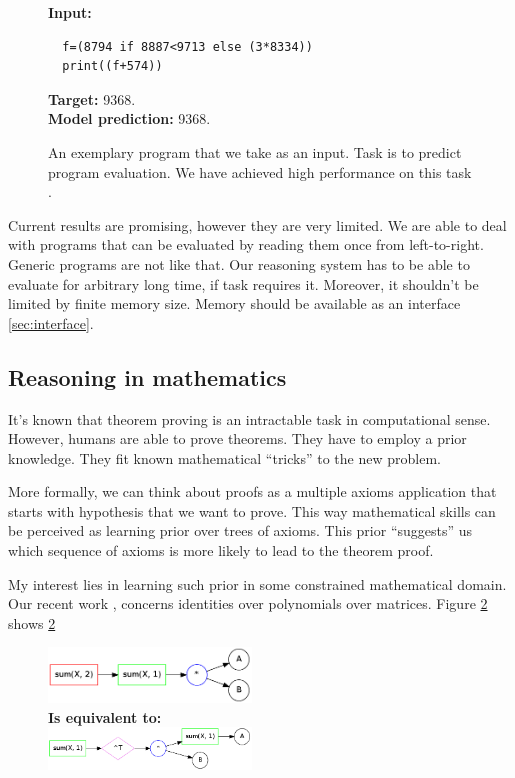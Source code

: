 \documentclass{article}
\begin{document}
\begin{figure}
  \begin{code}
  \begin{mdframed}
  {\bf Input:}
  \begin{lstlisting}
  f=(8794 if 8887<9713 else (3*8334))
  print((f+574))
  \end{lstlisting} 
  {\bf Target:} 9368. \\
  {\bf Model prediction:} 9368. 
  \end{mdframed}
  \end{code}
  \caption{An exemplary program that we take as an input. Task is to predict program evaluation. We have 
  achieved high performance on this task \cite{zaremba2014execute}.}
  \label{fig:prog}
\end{figure}


Current results are promising, however they are very limited. We are able to deal with programs
that can be evaluated by reading them once from left-to-right. Generic programs are not like that.
Our reasoning system has to be able to evaluate for arbitrary long time, if
task requires it. Moreover, it shouldn't be limited by finite memory size. Memory should be available
as an interface \ref{sec:interface}.


\subsection{Reasoning in mathematics}
It's known that theorem proving is an intractable task in computational sense. 
However, humans are able to prove theorems. They have to employ a prior
knowledge. They fit known mathematical ``tricks'' to the new problem.


More formally, we can think about proofs as a multiple axioms application that starts with
hypothesis that we want to prove. This way mathematical skills can be perceived as 
learning prior over trees of axioms. This prior ``suggests'' us which sequence of axioms is more
likely to lead to the theorem proof. 


My interest lies in learning such prior in some constrained mathematical 
domain. Our recent work \cite{zaremba2014learning}, concerns identities 
over polynomials over matrices. Figure \ref{fig:ident} shows \ref{fig:ident}


\begin{figure}
  \centering
  \includegraphics[width=0.48\textwidth]{imgs/example1_brute.png}\\
  {\bf Is equivalent to:}\\
  \includegraphics[width=0.48\textwidth]{imgs/example1_opt.png}\\
  \caption{\cite{zaremba2014learning}}
  \label{fig:ident}
\end{figure}
\end{document}
